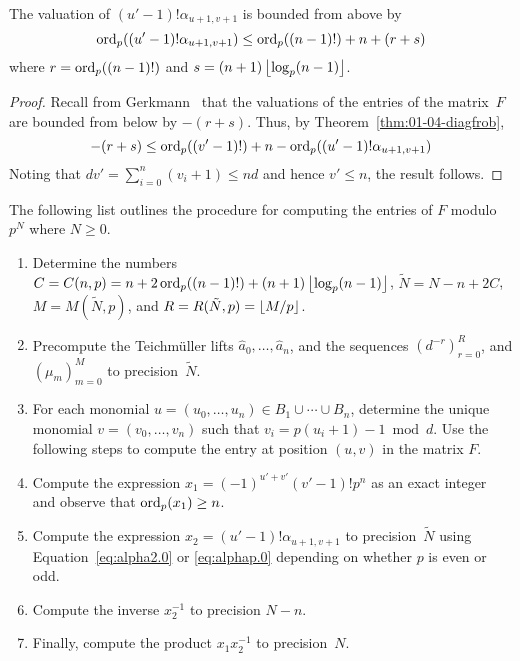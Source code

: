 \begin{prop}
The valuation of $(u'-1)! \alpha_{u+1,v+1}$ is bounded from above by 
\begin{equation*}
\operatorname{ord}_p((u'-1)! \alpha_{u+1,v+1}) \leq \operatorname{ord}_p((n-1)!) + n + (r + s)
\end{equation*}
where $r = \operatorname{ord}_p((n-1)!)$ and $s = (n+1) \left\lfloor\log_p(n-1)\right\rfloor$. 
\end{prop}

\begin{proof}
Recall from Gerkmann~\citep[Lemma~3.3]{Gerkmann2007} that the valuations 
of the entries of the matrix~$F$ are bounded from below by $-(r+s)$. 
Thus, by Theorem~\ref{thm:01-04-diagfrob}, 
\begin{equation*}
-(r+s) \leq \operatorname{ord}_p((v'-1)!) + n - \operatorname{ord}_p((u'-1)! \alpha_{u+1,v+1})
\end{equation*}
Noting that $d v' = \sum_{i=0}^n (v_i + 1) \leq n d$ and 
hence $v' \leq n$, the result follows.
\end{proof}

The following list outlines the procedure for computing 
the entries of $F$ modulo $p^N$ where $N \geq 0$.

\begin{enumerate}
\item Determine the numbers 
      $C = C(n,p) = n + 2 \operatorname{ord}_p((n-1)!) + (n+1) \left\lfloor\log_p(n-1)\right\rfloor$, 
      $\tilde{N} = N - n + 2 C$, $M = M(\tilde{N}, p)$, and 
      $R = R(\tilde{N}, p) = \left\lfloor M/p\right\rfloor$.
\item Precompute the Teichm\"uller lifts $\hat{a}_0, \dotsc, \hat{a}_n$, 
      and the sequences $(d^{-r})_{r=0}^R$, and $(\mu_m)_{m=0}^{M}$ 
      to precision~$\tilde{N}$.
\item For each monomial $u = (u_0, \dotsc, u_n) \in B_1 \cup \dotsb \cup B_n$, 
      determine the unique monomial $v = (v_0, \dotsc, v_n)$ such that 
      $v_i = p (u_i + 1) - 1 \bmod{d}$.  Use the following steps to 
      compute the entry at position $(u,v)$ in the matrix $F$.
\item Compute the expression $x_1 = (-1)^{u'+v'} (v'-1)! p^n$ as an 
      exact integer and observe that \mbox{$\operatorname{ord}_p(x_1) \geq n$}.
\item Compute the expression $x_2 = (u' - 1)! \alpha_{u+1,v+1}$ to 
      precision~$\tilde{N}$ using Equation~\eqref{eq:alpha2.0} or 
      \eqref{eq:alphap.0} depending on whether $p$ is even or odd. 
\item Compute the inverse $x_2^{-1}$ to precision $N - n$.
\item Finally, compute the product $x_1 x_2^{-1}$ to precision~$N$.
\end{enumerate}

